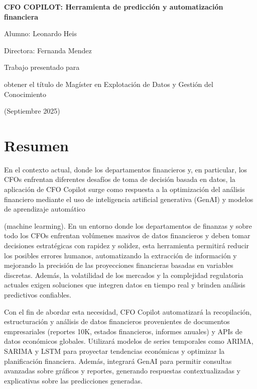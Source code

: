 \documentclass[12pt,letterpaper,oneside]{report}
\renewcommand{\_}{\UnderscoreOriginal\allowbreak}
\newcommand{\TituloTrabajo}{CFO COPILOT: Herramienta de predicción y automatización financiera}
\newcommand{\Alumno}{Leonardo Heis}
\newcommand{\Director}{Fernanda Mendez}
\newcommand{\TituloObtenido}{obtener el título de Magíster en Explotación de Datos y Gestión del Conocimiento}
\newcommand{\FechaTrabajo}{Septiembre 2025}
\begin{document}
\begin{titlepage}
\thispagestyle{empty}
\begin{center}
\vspace*{2cm}
{\Large\bfseries \TituloTrabajo\par}
\vfill
{\large Alumno: \Alumno\par}
\vspace{1cm}
{\large Directora: \Director\par}
\vfill
{\large Trabajo presentado para\par}
{\large \TituloObtenido\par}
\vfill
{\large (\FechaTrabajo)\par}
\end{center}
\end{titlepage}

\chapter*{Resumen}
En el contexto actual, donde los departamentos financieros y, en particular, los CFOs enfrentan diferentes desafíos de toma de decisión basada en datos, la aplicación de CFO Copilot surge como respuesta a la optimización del análisis financiero mediante el uso de inteligencia artificial generativa (GenAI) y modelos de aprendizaje automático

(machine learming). En un entorno donde los departamentos de finanzas y sobre todo los CFOs enfrentan volúmenes masivos de datos financieros y deben tomar decisiones estratégicas con rapidez y solidez, esta herramienta permitirá reducir los posibles errores humanos, automatizando la extracción de información y mejorando la precisión de las proyecciones financieras basadas en variables discretas. Además, la volatilidad de los mercados y la complejidad regulatoria actuales exigen soluciones que integren datos en tiempo real y brinden análisis predictivos confiables.

Con el fin de abordar esta necesidad, CFO Copilot automatizará la recopilación, estructuración y análisis de datos financieros provenientes de documentos empresariales (reportes 10K, estados financieros, informes anuales) y APIs de datos económicos globales. Utilizará modelos de series temporales como ARIMA, SARIMA y LSTM para proyectar tendencias económicas y optimizar la planificación financiera. Además, integrará GenAI para permitir consultas avanzadas sobre gráficos y reportes, generando respuestas contextualizadas y explicativas sobre las predicciones generadas.
\end{document}
